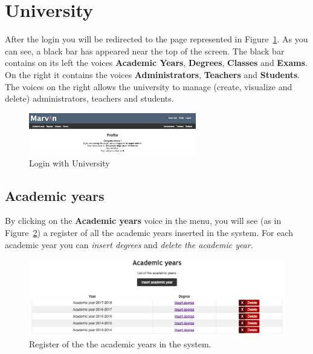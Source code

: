 \newpage
\section{University}
After the login you will be redirected to the page represented in Figure~\ref{fig:loggedProfile}. As you can see, a black bar has appeared near the top of the screen.
The black bar contains on its left the voices \textbf{Academic Years}, \textbf{Degrees}, \textbf{Classes} and \textbf{Exams}. On the right it contains the voices \textbf{Administrators}, \textbf{Teachers} and \textbf{Students}.
The voices on the right allows the university to manage (create, visualize and delete) administrators, teachers and students.
\begin{figure}[!h]
\centering
\includegraphics[width=0.65\textwidth]{img/loggedProfile.png}
\caption{Login with University}
\label{fig:loggedProfile}
\end{figure}

\subsection{Academic years}
By clicking on the \textbf{Academic years} voice in the menu, you will see (as in Figure~\ref{fig:acadYear}) a register of all the academic years inserted in the system. For each academic year you can \emph{insert degrees} and \emph{delete the academic year}.
\begin{figure}[!h]
  \centering
  \includegraphics[width=1.0\textwidth]{img/accademicYears.png}
  \caption{Register of the the academic years in the system.}
  \label{fig:acadYear}
\end{figure}

